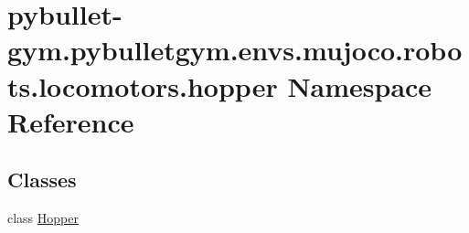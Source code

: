 \hypertarget{namespacepybullet-gym_1_1pybulletgym_1_1envs_1_1mujoco_1_1robots_1_1locomotors_1_1hopper}{}\section{pybullet-\/gym.pybulletgym.\+envs.\+mujoco.\+robots.\+locomotors.\+hopper Namespace Reference}
\label{namespacepybullet-gym_1_1pybulletgym_1_1envs_1_1mujoco_1_1robots_1_1locomotors_1_1hopper}
\subsection*{Classes}
\begin{DoxyCompactItemize}
\item 
class \hyperlink{classpybullet-gym_1_1pybulletgym_1_1envs_1_1mujoco_1_1robots_1_1locomotors_1_1hopper_1_1_hopper}{Hopper}
\end{DoxyCompactItemize}
